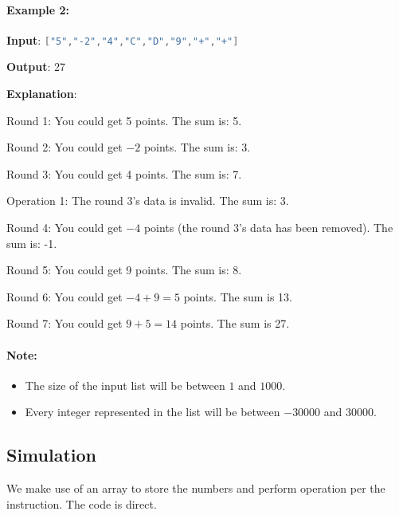 \paragraph{Example 2:}
\begin{flushleft}


\textbf{Input}: \lstinline[language=C++, basicstyle=\small\ttfamily, keywordstyle=\bfseries\color{green!40!black}]|["5","-2","4","C","D","9","+","+"]|

\textbf{Output}: 27

\textbf{Explanation}: 

Round 1: You could get 5 points. The sum is: 5.

Round 2: You could get $-2$ points. The sum is: 3.

Round 3: You could get 4 points. The sum is: 7.

Operation 1: The round 3's data is invalid. The sum is: 3.  

Round 4: You could get $-4$ points (the round 3's data has been removed). The sum is: -1.

Round 5: You could get 9 points. The sum is: 8.

Round 6: You could get $-4 + 9 = 5$ points. The sum is 13.

Round 7: You could get $9 + 5 = 14$ points. The sum is 27.
\end{flushleft}
\paragraph{Note:}
\begin{itemize}
\item The size of the input list will be between $1$ and $1000$.
\item Every integer represented in the list will be between $-30000$ and $30000$.
\end{itemize}

\subsection{Simulation}
We make use of an array to store the numbers and perform operation per the instruction. The code is direct.

